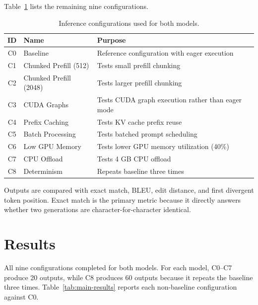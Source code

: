 \documentclass[11pt, letterpaper]{article}
\begin{document}
Table~\ref{tab:configs}
lists the remaining nine configurations.

\begin{table}[h]
\centering
\caption{Inference configurations used for both models.}
\label{tab:configs}
\small
\begin{tabularx}{\textwidth}{@{} c l X @{} }
\toprule
\textbf{ID} & \textbf{Name} & \textbf{Purpose} \\
\midrule
C0 & Baseline & Reference configuration with eager execution \\
C1 & Chunked Prefill (512) & Tests small prefill chunking \\
C2 & Chunked Prefill (2048) & Tests larger prefill chunking \\
C3 & CUDA Graphs & Tests CUDA graph execution rather than eager mode \\
C4 & Prefix Caching & Tests KV cache prefix reuse \\
C5 & Batch Processing & Tests batched prompt scheduling \\
C6 & Low GPU Memory & Tests lower GPU memory utilization (40\%) \\
C7 & CPU Offload & Tests 4 GB CPU offload \\
C8 & Determinism & Repeats baseline three times \\
\bottomrule
\end{tabularx}
\end{table}

Outputs are compared with exact match, BLEU, edit distance, and first divergent
token position.  Exact match is the primary metric because it directly answers
whether two generations are character-for-character identical.

\section{Results}

All nine configurations completed for both models.  For each model, C0--C7
produce 20 outputs, while C8 produces 60 outputs because it repeats the
baseline three times.  Table~\ref{tab:main-results} reports each non-baseline
configuration against C0.
\end{document}
